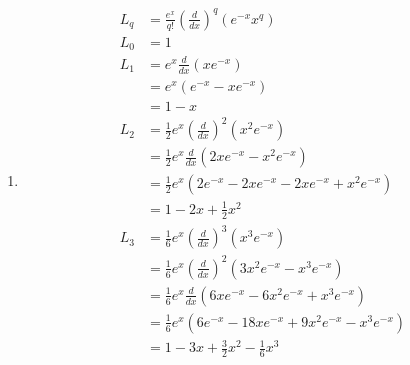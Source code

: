 \documentclass{article}
\begin{document}
\subsection{}

\begin{enumerate}
  \item

        \begin{align*}
          L_q & = \frac{e^x}{q!} \left( \frac{d}{d x} \right)^q (e^{-x} x^q)                 \\
          L_0 & = 1                                                                          \\
          L_1 & = e^x \frac{d}{d x} (x e^{-x})                                               \\
              & = e^x (e^{-x} - x e^{-x})                                                    \\
              & = 1 - x                                                                      \\
          L_2 & = \frac{1}{2} e^x \left( \frac{d}{d x} \right)^2 (x^2 e^{-x})                \\
              & = \frac{1}{2} e^x \frac{d}{d x} (2 x e^{-x} - x^2 e^{-x})                    \\
              & = \frac{1}{2} e^x (2 e^{-x} - 2 x e^{-x} - 2 x e^{-x} + x^2 e^{-x})          \\
              & = 1 - 2 x + \frac{1}{2} x^2                                                  \\
          L_3 & = \frac{1}{6} e^x \left( \frac{d}{d x} \right)^3 (x^3 e^{-x})                \\
              & = \frac{1}{6} e^x \left( \frac{d}{d x} \right)^2 (3 x^2 e^{-x} - x^3 e^{-x}) \\
              & = \frac{1}{6} e^x \frac{d}{d x} (6 x e^{-x} - 6 x^2 e^{-x} + x^3 e^{-x})     \\
              & = \frac{1}{6} e^x (6 e^{-x} - 18 x e^{-x} + 9 x^2 e^{-x} - x^3 e^{-x})       \\
              & = 1 - 3 x + \frac{3}{2} x^2 - \frac{1}{6} x^3
        \end{align*}
\end{enumerate}

\subsection{}
\end{document}
